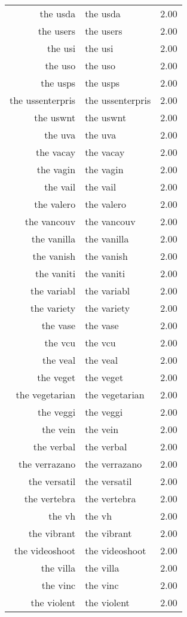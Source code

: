 \begin{table}[ht]
\begin{tabular}{rlr}
  the usda & the usda & 2.00 \\ 
  the users & the users & 2.00 \\ 
  the usi & the usi & 2.00 \\ 
  the uso & the uso & 2.00 \\ 
  the usps & the usps & 2.00 \\ 
  the ussenterpris & the ussenterpris & 2.00 \\ 
  the uswnt & the uswnt & 2.00 \\ 
  the uva & the uva & 2.00 \\ 
  the vacay & the vacay & 2.00 \\ 
  the vagin & the vagin & 2.00 \\ 
  the vail & the vail & 2.00 \\ 
  the valero & the valero & 2.00 \\ 
  the vancouv & the vancouv & 2.00 \\ 
  the vanilla & the vanilla & 2.00 \\ 
  the vanish & the vanish & 2.00 \\ 
  the vaniti & the vaniti & 2.00 \\ 
  the variabl & the variabl & 2.00 \\ 
  the variety & the variety & 2.00 \\ 
  the vase & the vase & 2.00 \\ 
  the vcu & the vcu & 2.00 \\ 
  the veal & the veal & 2.00 \\ 
  the veget & the veget & 2.00 \\ 
  the vegetarian & the vegetarian & 2.00 \\ 
  the veggi & the veggi & 2.00 \\ 
  the vein & the vein & 2.00 \\ 
  the verbal & the verbal & 2.00 \\ 
  the verrazano & the verrazano & 2.00 \\ 
  the versatil & the versatil & 2.00 \\ 
  the vertebra & the vertebra & 2.00 \\ 
  the vh & the vh & 2.00 \\ 
  the vibrant & the vibrant & 2.00 \\ 
  the videoshoot & the videoshoot & 2.00 \\ 
  the villa & the villa & 2.00 \\ 
  the vinc & the vinc & 2.00 \\ 
  the violent & the violent & 2.00 \\ 

\end{tabular}
\end{table}
